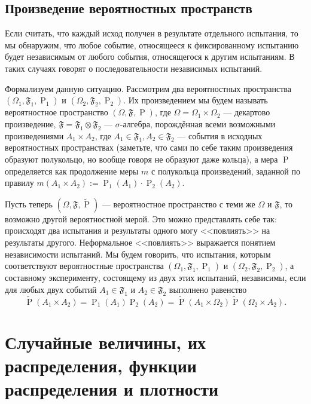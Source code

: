 \documentclass[12pt]{article}
\numberwithin{theorem}{section}
\theoremstyle{definition}
\newcommand{\defin}[2]{\hypertarget{#2}{{\color{red} #1}}}
\newcommand{\prob}{\operatorname{P}}
\newcommand{\events}{\mathfrak{F}}
\begin{document}
	\subsection{Произведение вероятностных пространств}
	
	Если считать, что каждый исход получен в результате отдельного испытания,
	то мы обнаружим, что любое событие, относящееся к фиксированному испытанию
	будет независимым от любого события, относящегося к другим испытаниям.
	В таких случаях говорят о последовательности независимых испытаний.
	
	Формализуем данную ситуацию. Рассмотрим два вероятностных пространства $ (\Omega_1, \events_1, \prob_1) $
	и $ (\Omega_2, \events_2, \prob_2) $. Их \defin{произведением}{product-of-probability-spaces} мы будем называть вероятностное пространство
	$ (\Omega, \events, \prob) $, где $ \Omega = \Omega_1 \times \Omega_2 $ --- декартово произведение,
	$ \events = \events_1 \otimes \events_2 $ --- $ \sigma $-алгебра, порождённая всеми возможными произведениями $ A_1 \times A_2 $,
	где $ A_1 \in \events_1, A_2 \in \events_2 $ --- события в исходных вероятностных пространствах
	(заметьте, что сами по себе таким произведения образуют полукольцо, но вообще говоря не образуют даже кольца),
	а мера $ \prob $ определяется как продолжение меры $ m $ с полукольца произведений, заданной по правилу
	$ m(A_1 \times A_2) := \prob_1(A_1)\cdot \prob_2(A_2) $.
	
	Пусть теперь $ (\Omega, \events, \tilde{\prob}) $ --- вероятностное пространство с теми же $ \Omega $
	и $ \events $, то возможно другой вероятностной мерой. 
	Это можно представлять себе так: происходят два испытания и результаты одного могу <<повлиять>> на результаты другого. 
	Неформальное <<повлиять>> выражается понятием независимости испытаний.
	Мы будем говорить, что испытания, которым соответствуют вероятностные пространства
	$ (\Omega_1, \events_1, \prob_1) $ и $ (\Omega_2, \events_2, \prob_2) $,
	а составному эксперименту, состоящему из двух этих испытаний, \defin{независимы}{independent-experiments},
	если для любых двух событий $ A_1 \in \events_1 $ и $ A_2 \in \events_2 $ выполнено равенство
	$$ \tilde{\prob}(A_1 \times A_2) = \prob_1(A_1)\prob_2(A_2) 
	= \tilde{\prob}(A_1 \times \Omega_2)\tilde{\prob}(\Omega_2 \times A_2). $$

	\section{Случайные величины, их распределения, функции распределения и плотности}
	
\end{document}
